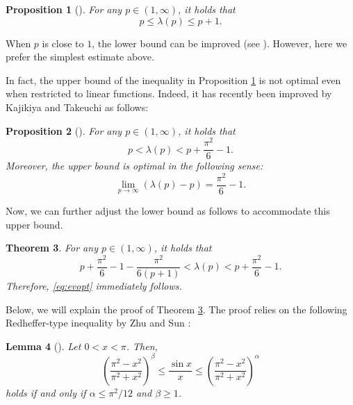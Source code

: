 \documentclass[12pt]{amsart}
\numberwithin{equation}{section}
\theoremstyle{plain}
\newtheorem{thm}{Theorem}[section]
\newtheorem{lem}[thm]{Lemma}
\newtheorem{prop}[thm]{Proposition}
\theoremstyle{definition}
\theoremstyle{remark}
\begin{document}
\begin{prop}[\cites{H1997,BD2012}]
\label{thm:BD2012}
For any $p \in (1,\infty)$, it holds that
\[p \leq \lambda(p) \leq p+1.\]
\end{prop}

When $p$ is close to $1$, the lower bound can be improved (see \cites{BD2013,BEZ2009}). However, here we prefer the simplest estimate above.

In fact, the upper bound of the inequality in Proposition \ref{thm:BD2012}
is not optimal even when restricted to linear functions.
Indeed, it has recently been improved 
by Kajikiya and Takeuchi \cite{KT2025} as follows:

\begin{prop}[\cite{KT2025}]
\label{thm:KT2025}
For any $p \in (1,\infty)$, it holds that
\begin{equation*}
p <\lambda(p) <p+\frac{\pi^2}{6}-1.
\end{equation*}
Moreover, the upper bound is optimal in the following sense:
\begin{equation}
\label{eq:evopt}
\lim_{p \to \infty}(\lambda(p)-p)=\frac{\pi^2}{6}-1.
\end{equation}
\end{prop}

Now, we can further adjust the lower bound as follows to accommodate this upper bound.

\begin{thm}
\label{thm:eigenvalue}
For any $p \in (1,\infty)$, it holds that
\begin{equation}
\label{eq:egineq}
p+\frac{\pi^2}{6}-1-\frac{\pi^2}{6(p+1)}
<\lambda(p)
<p+\frac{\pi^2}{6}-1.
\end{equation}
Therefore, \eqref{eq:evopt} immediately follows.
\end{thm}

Below, we will explain the proof of Theorem \ref{thm:eigenvalue}.
The proof relies on the following 
Redheffer-type inequality by Zhu and Sun \cite{ZS2008}:

\begin{lem}[\cite{ZS2008}]
\label{lem:ZS2008}
Let $0<x<\pi$. Then,
\[\left(\frac{\pi^2-x^2}{\pi^2+x^2}\right)^\beta
\leq \frac{\sin{x}}{x} \leq 
\left(\frac{\pi^2-x^2}{\pi^2+x^2}\right)^\alpha\]
holds if and only if $\alpha \leq \pi^2/12$ and $\beta \geq 1$.
\end{lem}
\end{document}
